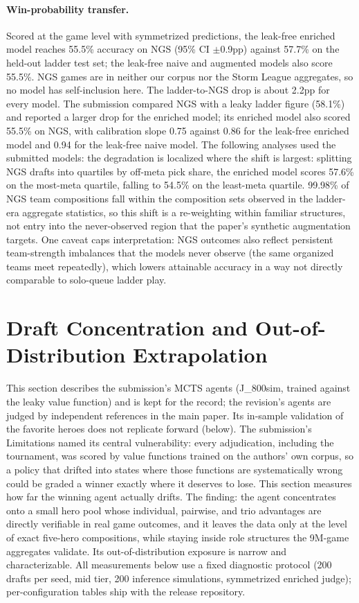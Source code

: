 \documentclass[journal]{IEEEtran}
\newcommand{\added}[1]{{\color{blue}#1}}
\newcommand{\added}[1]{#1}
\begin{document}
\paragraph{Win-probability transfer.} \added{Scored at the game level with symmetrized predictions, the leak-free enriched model reaches 55.5\% accuracy on NGS (95\% CI $\pm$0.9pp) against 57.7\% on the held-out ladder test set; the leak-free naive and augmented models also score 55.5\%. NGS games are in neither our corpus nor the Storm League aggregates, so no model has self-inclusion here. The ladder-to-NGS drop is about 2.2pp for every model. The submission compared NGS with a leaky ladder figure (58.1\%) and reported a larger drop for the enriched model; its enriched model also scored 55.5\% on NGS, with calibration slope 0.75 against 0.86 for the leak-free enriched model and 0.94 for the leak-free naive model.} The following analyses used the submitted models: the degradation is localized where the shift is largest: splitting NGS drafts into quartiles by off-meta pick share, the enriched model scores 57.6\% on the most-meta quartile, falling to 54.5\% on the least-meta quartile. 99.98\% of NGS team compositions fall within the composition sets observed in the ladder-era aggregate statistics, so this shift is a re-weighting within familiar structures, not entry into the never-observed region that the paper's synthetic augmentation targets. One caveat caps interpretation: NGS outcomes also reflect persistent team-strength imbalances that the models never observe (the same organized teams meet repeatedly), which lowers attainable accuracy in a way not directly comparable to solo-queue ladder play.

\section{Draft Concentration and Out-of-Distribution Extrapolation}
\label{sec:concentration}

\added{This section describes the submission's MCTS agents (J\_800sim, trained against the leaky value function) and is kept for the record; the revision's agents are judged by independent references in the main paper. Its in-sample validation of the favorite heroes does not replicate forward (below).} The submission's Limitations named its central vulnerability: every adjudication, including the tournament, was scored by value functions trained on the authors' own corpus, so a policy that drifted into states where those functions are systematically wrong could be graded a winner exactly where it deserves to lose. This section measures how far the winning agent actually drifts. The finding: the agent concentrates onto a small hero pool whose individual, pairwise, and trio advantages are directly verifiable in real game outcomes, and it leaves the data only at the level of exact five-hero compositions, while staying inside role structures the 9M-game aggregates validate. Its out-of-distribution exposure is narrow and characterizable. All measurements below use a fixed diagnostic protocol (200 drafts per seed, mid tier, 200 inference simulations, symmetrized enriched judge); per-configuration tables ship with the release repository.
\end{document}
